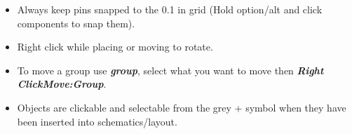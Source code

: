 \documentclass{article}
\begin{document}
\begin{tcolorbox} [title=Tips \& Tricks]
    \begin{itemize}
        \item Always keep pins snapped to the 0.1 in grid (Hold option/alt and click components to snap them).
        \item Right click while placing or moving to rotate.
        \item To move a group use \textit{\textbf{group}}, select what you want to move then \textit{\textbf{Right Click\textrightarrow Move:Group}}.
        \item Objects are clickable and selectable from the grey + symbol when they have been inserted into schematics/layout.
    \end{itemize}
\end{tcolorbox}
\end{document}
